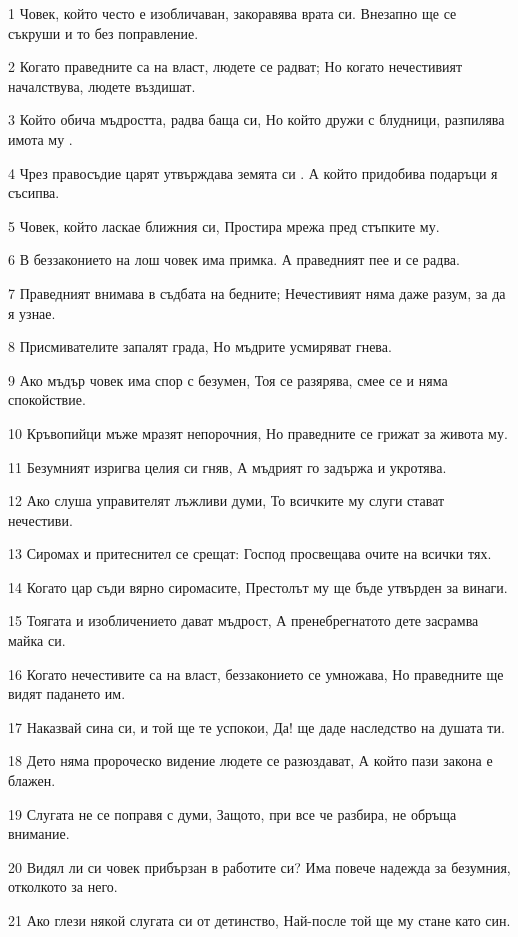 \par 1 Човек, който често е изобличаван, закоравява врата си. Внезапно ще се съкруши и то без поправление.
\par 2 Когато праведните са на власт, людете се радват; Но когато нечестивият началствува, людете въздишат.
\par 3 Който обича мъдростта, радва баща си, Но който дружи с блудници, разпилява имота му .
\par 4 Чрез правосъдие царят утвърждава земята си . А който придобива подаръци я съсипва.
\par 5 Човек, който ласкае ближния си, Простира мрежа пред стъпките му.
\par 6 В беззаконието на лош човек има примка. А праведният пее и се радва.
\par 7 Праведният внимава в съдбата на бедните; Нечестивият няма даже разум, за да я узнае.
\par 8 Присмивателите запалят града, Но мъдрите усмиряват гнева.
\par 9 Ако мъдър човек има спор с безумен, Тоя се разярява, смее се и няма спокойствие.
\par 10 Кръвопийци мъже мразят непорочния, Но праведните се грижат за живота му.
\par 11 Безумният изригва целия си гняв, А мъдрият го задържа и укротява.
\par 12 Ако слуша управителят лъжливи думи, То всичките му слуги стават нечестиви.
\par 13 Сиромах и притеснител се срещат: Господ просвещава очите на всички тях.
\par 14 Когато цар съди вярно сиромасите, Престолът му ще бъде утвърден за винаги.
\par 15 Тоягата и изобличението дават мъдрост, А пренебрегнатото дете засрамва майка си.
\par 16 Когато нечестивите са на власт, беззаконието се умножава, Но праведните ще видят падането им.
\par 17 Наказвай сина си, и той ще те успокои, Да! ще даде наследство на душата ти.
\par 18 Дето няма пророческо видение людете се разюздават, А който пази закона е блажен.
\par 19 Слугата не се поправя с думи, Защото, при все че разбира, не обръща внимание.
\par 20 Видял ли си човек прибързан в работите си? Има повече надежда за безумния, отколкото за него.
\par 21 Ако глези някой слугата си от детинство, Най-после той ще му стане като син.
